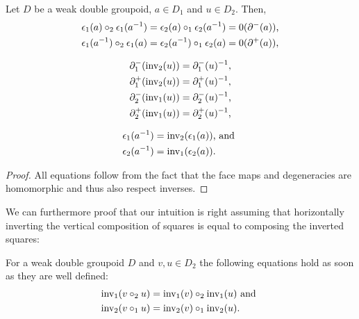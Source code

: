 \begin{lemma} \label{thm:dbl-gpd-inv} %
Let $D$ be a weak double groupoid, $a \in D_1$ and $u \in D_2$. Then,
\begin{equation} \label{eq:inv-coherence1}
\begin{aligned}
\epsilon_1(a) \circ_2 \epsilon_1(a^{-1})
	&= \epsilon_2(a) \circ_1 \epsilon_2(a^{-1})
	= 0(\partial^-(a)) \text{,} \\
\epsilon_1(a^{-1}) \circ_2 \epsilon_1(a)
	&= \epsilon_2(a^{-1}) \circ_1 \epsilon_2(a)
	= 0(\partial^+(a)) \text{,}
\end{aligned}
\end{equation}

\begin{equation} \label{eq:inv-coherence2}
\begin{aligned}
\partial^-_1(\operatorname{inv_2}(u)) &= \partial^-_1(u)^{-1} \text{,} \\
\partial^+_1(\operatorname{inv_2}(u)) &= \partial^+_1(u)^{-1} \text{,} \\
\partial^-_2(\operatorname{inv_1}(u)) &= \partial^-_2(u)^{-1} \text{,} \\
\partial^+_2(\operatorname{inv_1}(u)) &= \partial^+_2(u)^{-1} \text{,}
\end{aligned}
\end{equation}

\begin{equation} \label{eq:inv-coherence3}
\begin{aligned}
\epsilon_1(a^{-1}) &= \operatorname{inv_2}(\epsilon_1(a)) \text{, and } \\
\epsilon_2(a^{-1}) &= \operatorname{inv_1}(\epsilon_2(a)) \text{.}
\end{aligned}
\end{equation}
\end{lemma}

\begin{proof}
All equations follow
from the fact that the face maps and degeneracies are homomorphic and thus also
respect inverses.
\end{proof}

We can furthermore proof that our intuition is right assuming that horizontally
inverting the vertical composition of squares is equal to composing the inverted
squares:

\begin{lemma} For a weak double groupoid $D$ and
$v, u \in D_2$ the following equations hold as soon as they are well defined:
\begin{equation} \label{eq:inv-distrib}
\begin{aligned}
\operatorname{inv_1}(v \circ_2 u) &= \operatorname{inv_1}(v) \circ_2 \operatorname{inv_1}(u) \text{ and } \\
\operatorname{inv_2}(v \circ_1 u) &= \operatorname{inv_2}(v) \circ_1 \operatorname{inv_2}(u) \text{.}
\end{aligned}
\end{equation}
\end{lemma}

